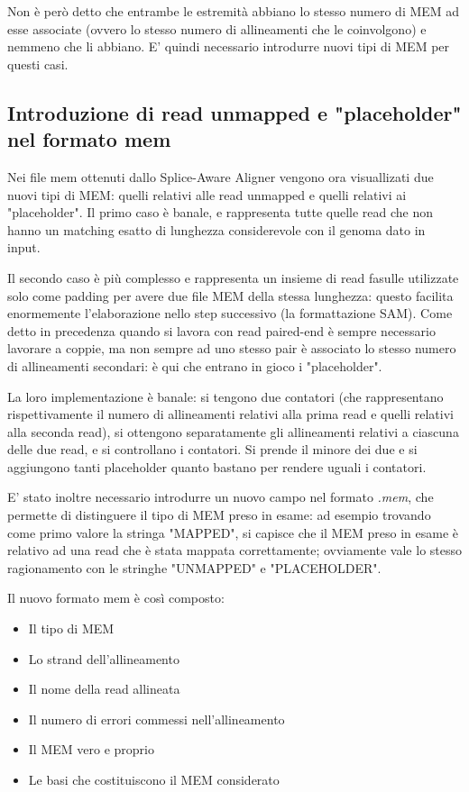Non è però detto che entrambe le estremità abbiano lo stesso numero di MEM ad esse associate (ovvero lo stesso numero di allineamenti che le coinvolgono) e nemmeno che li abbiano. E' quindi necessario introdurre nuovi tipi di MEM per questi casi.


\subsection{Introduzione di read unmapped e "placeholder" nel formato mem}
Nei file mem ottenuti dallo Splice-Aware Aligner vengono ora visuallizati due nuovi tipi di MEM: quelli relativi alle read unmapped e quelli relativi ai "placeholder". Il primo caso è banale, e rappresenta tutte quelle read che non hanno un matching esatto di lunghezza considerevole con il genoma dato in input.

Il secondo caso è più complesso e rappresenta un insieme di read fasulle utilizzate solo come padding per avere due file MEM della stessa lunghezza: questo facilita enormemente l'elaborazione nello step successivo (la formattazione SAM). Come detto in precedenza quando si lavora con read paired-end è sempre necessario lavorare a coppie, ma non sempre ad uno stesso pair è associato lo stesso numero di allineamenti secondari: è qui che entrano in gioco i "placeholder". 

La loro implementazione è banale: si tengono due contatori (che rappresentano rispettivamente il numero di allineamenti relativi alla prima read e quelli relativi alla seconda read), si ottengono separatamente gli allineamenti relativi a ciascuna delle due read, e si controllano i contatori. Si prende il minore dei due e si aggiungono tanti placeholder quanto bastano per rendere uguali i contatori.

E' stato inoltre necessario introdurre un nuovo campo nel formato \textit{.mem}, che permette di distinguere il tipo di MEM preso in esame: ad esempio trovando come primo valore la stringa "MAPPED", si capisce che il MEM preso in esame è relativo ad una read che è stata mappata correttamente; ovviamente vale lo stesso ragionamento con le stringhe "UNMAPPED" e "PLACEHOLDER".

\newpage

Il nuovo formato mem è così composto:

\begin{itemize}
	\item Il tipo di MEM
	\item Lo strand dell'allineamento
	\item	Il nome della read allineata
	\item Il numero di errori commessi nell'allineamento 
	\item Il MEM vero e proprio
	\item Le basi che costituiscono il MEM considerato
\end{itemize}

